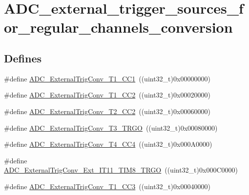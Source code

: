 \hypertarget{group__ADC__external__trigger__sources__for__regular__channels__conversion}{
\section{ADC\_\-external\_\-trigger\_\-sources\_\-for\_\-regular\_\-channels\_\-conversion}
\label{group__ADC__external__trigger__sources__for__regular__channels__conversion}
}
\subsection*{Defines}
\begin{DoxyCompactItemize}
\item 
\#define \hyperlink{group__ADC__external__trigger__sources__for__regular__channels__conversion_ga303f24361ea930f8214e9e68b63b244e}{ADC\_\-ExternalTrigConv\_\-T1\_\-CC1}~((uint32\_\-t)0x00000000)
\item 
\#define \hyperlink{group__ADC__external__trigger__sources__for__regular__channels__conversion_ga8bf9fd9ad4e4c12ef41520ded2c3c332}{ADC\_\-ExternalTrigConv\_\-T1\_\-CC2}~((uint32\_\-t)0x00020000)
\item 
\#define \hyperlink{group__ADC__external__trigger__sources__for__regular__channels__conversion_gadfeb40c1735b0ee50f8a5aafdd840cc6}{ADC\_\-ExternalTrigConv\_\-T2\_\-CC2}~((uint32\_\-t)0x00060000)
\item 
\#define \hyperlink{group__ADC__external__trigger__sources__for__regular__channels__conversion_ga1cf4549534a00fe2f5527ad783204098}{ADC\_\-ExternalTrigConv\_\-T3\_\-TRGO}~((uint32\_\-t)0x00080000)
\item 
\#define \hyperlink{group__ADC__external__trigger__sources__for__regular__channels__conversion_ga8f6a764b7de878c2e09bbb0d1061d69c}{ADC\_\-ExternalTrigConv\_\-T4\_\-CC4}~((uint32\_\-t)0x000A0000)
\item 
\#define \hyperlink{group__ADC__external__trigger__sources__for__regular__channels__conversion_ga640de59aeac8cc3d96b6db3497975d02}{ADC\_\-ExternalTrigConv\_\-Ext\_\-IT11\_\-TIM8\_\-TRGO}~((uint32\_\-t)0x000C0000)
\item 
\#define \hyperlink{group__ADC__external__trigger__sources__for__regular__channels__conversion_ga41ad03e2921f6de0fb75ae06d6046e63}{ADC\_\-ExternalTrigConv\_\-T1\_\-CC3}~((uint32\_\-t)0x00040000)
\item 

\end{DoxyCompactItemize}

